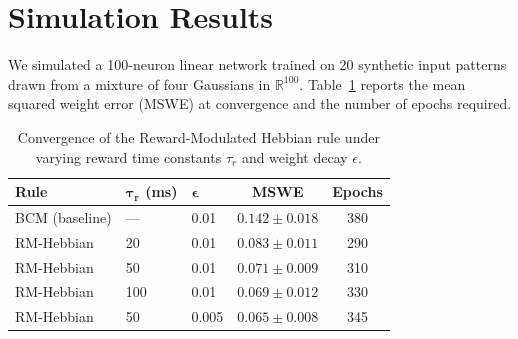 \section{Simulation Results}

We simulated a 100-neuron linear network trained on 20 synthetic input patterns drawn
from a mixture of four Gaussians in $\mathbb{R}^{100}$.  Table~\ref{tab:hebbian-results}
reports the mean squared weight error (MSWE) at convergence and the number of epochs
required.

\begin{table}[H]
\centering
\caption{Convergence of the Reward-Modulated Hebbian rule under varying reward time
  constants $\tau_r$ and weight decay $\epsilon$.}
\label{tab:hebbian-results}
\setlength{\arrayrulewidth}{0.5pt}
\begin{tabularx}{0.86\linewidth}{@{}lllcc@{}}
\toprule
\textbf{Rule} & $\boldsymbol{\tau_r}$ (ms) & $\boldsymbol{\epsilon}$
  & \textbf{MSWE} & \textbf{Epochs} \\
\midrule
BCM (baseline)         & ---    & 0.01  & $0.142 \pm 0.018$ & 380 \\
RM-Hebbian             & 20     & 0.01  & $0.083 \pm 0.011$ & 290 \\
RM-Hebbian             & 50     & 0.01  & $0.071 \pm 0.009$ & 310 \\
RM-Hebbian             & 100    & 0.01  & $0.069 \pm 0.012$ & 330 \\
RM-Hebbian             & 50     & 0.005 & $0.065 \pm 0.008$ & 345 \\
\bottomrule
\end{tabularx}
\end{table}

